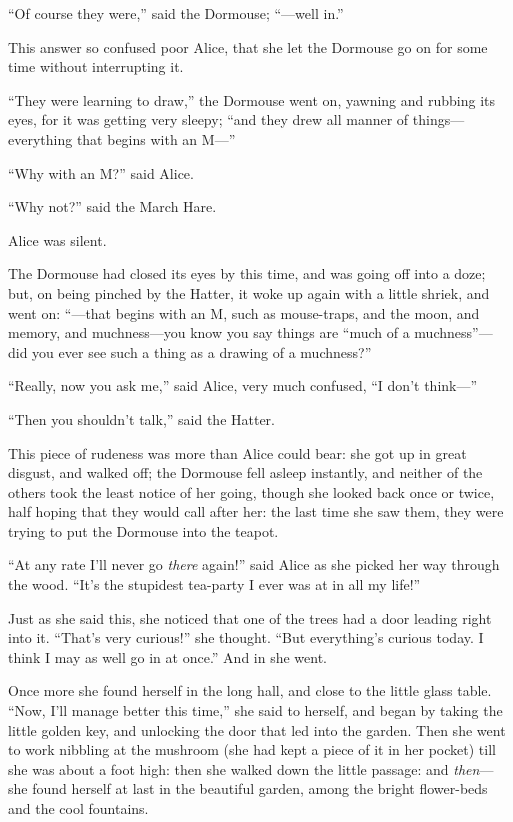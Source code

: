 \documentclass[book, 20pt]{extbook}
\begin{document}
``Of course they were,'' said the Dormouse; ``---well in.''

This answer so confused poor Alice, that she let the Dormouse go on for
some time without interrupting it.

``They were learning to draw,'' the Dormouse went on, yawning and
rubbing its eyes, for it was getting very sleepy; ``and they drew all
manner of things---everything that begins with an M---''

``Why with an M?'' said Alice.

``Why not?'' said the March Hare.

Alice was silent.

The Dormouse had closed its eyes by this time, and was going off into a
doze; but, on being pinched by the Hatter, it woke up again with a
little shriek, and went on: ``---that begins with an M, such as
mouse-traps, and the moon, and memory, and muchness---you know you say
things are ``much of a muchness''---did you ever see such a thing as a
drawing of a muchness?''

``Really, now you ask me,'' said Alice, very much confused, ``I don't
think---''

``Then you shouldn't talk,'' said the Hatter.

This piece of rudeness was more than Alice could bear: she got up in
great disgust, and walked off; the Dormouse fell asleep instantly, and
neither of the others took the least notice of her going, though she
looked back once or twice, half hoping that they would call after her:
the last time she saw them, they were trying to put the Dormouse into
the teapot.

``At any rate I'll never go \emph{there} again!'' said Alice as she
picked her way through the wood. ``It's the stupidest tea-party I ever
was at in all my life!''

Just as she said this, she noticed that one of the trees had a door
leading right into it. ``That's very curious!'' she thought. ``But
everything's curious today. I think I may as well go in at once.'' And
in she went.

Once more she found herself in the long hall, and close to the little
glass table. ``Now, I'll manage better this time,'' she said to herself,
and began by taking the little golden key, and unlocking the door that
led into the garden. Then she went to work nibbling at the mushroom (she
had kept a piece of it in her pocket) till she was about a foot high:
then she walked down the little passage: and \emph{then}---she found
herself at last in the beautiful garden, among the bright flower-beds
and the cool fountains.
\end{document}
